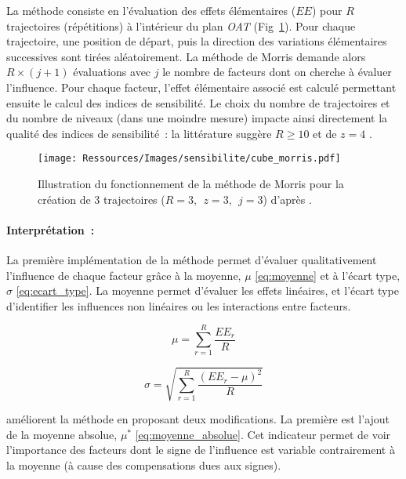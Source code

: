 La méthode consiste en l’évaluation des effets élémentaires ($EE$) pour $R$ trajectoires
(répétitions) à l’intérieur du plan \textit{OAT} (Fig~\ref{fig:fonctionnement_morris}).
Pour chaque trajectoire, une position de départ, puis la direction des variations
élémentaires successives sont tirées aléatoirement. La méthode de Morris demande alors $R
\times (j + 1)$ évaluations avec $j$ le nombre de facteurs dont on cherche à évaluer
l’influence. Pour chaque facteur, l’effet élémentaire associé est calculé permettant ensuite
le calcul des indices de sensibilité. Le choix du nombre de trajectoires et du nombre de
niveaux (dans une moindre mesure) impacte ainsi directement la qualité des indices de
sensibilité~: la littérature suggère $R \geq 10$ et de $z = 4$ \parencite{Campolongo20071509}.

\begin{figure}
    \begin{center}
        \texttt{[image: Ressources/Images/sensibilite/cube\_morris.pdf]}
    \end{center}
    \caption{Illustration du fonctionnement de la méthode de Morris pour la création
             de 3 trajectoires ($R = 3,~~ z = 3,~~ j = 3$) d’après \textcite{Munaretto2014}.
             \label{fig:fonctionnement_morris}}
\end{figure}

\paragraph{Interprétation~:} %
\label{par:interprétation}
La première implémentation de la méthode permet d’évaluer qualitativement l’influence de
chaque facteur grâce à la moyenne, $\mu$ \eqref{eq:moyenne} et à l’écart type, $\sigma$
\eqref{eq:ecart_type}. La moyenne permet d’évaluer les effets linéaires, et l’écart type
d’identifier les influences non linéaires ou les interactions entre facteurs.

\begin{equation}\label{eq:moyenne}
    \mu = \sum_{r = 1}^{R} \frac{EE_{r}}{R}
\end{equation}

\begin{equation}\label{eq:ecart_type}
    \sigma = \sqrt{\sum_{r=1}^{R}\frac{(EE_{r} - \mu)^{2}}{R}}
\end{equation}

\textcite{Campolongo20071509} améliorent la méthode en proposant deux modifications. La première
est l’ajout de la moyenne absolue, $\mu^{*}$ \eqref{eq:moyenne_absolue}. Cet indicateur permet
de voir l’importance des facteurs dont le signe de l’influence est variable contrairement à
la moyenne (à cause des compensations dues aux signes).

